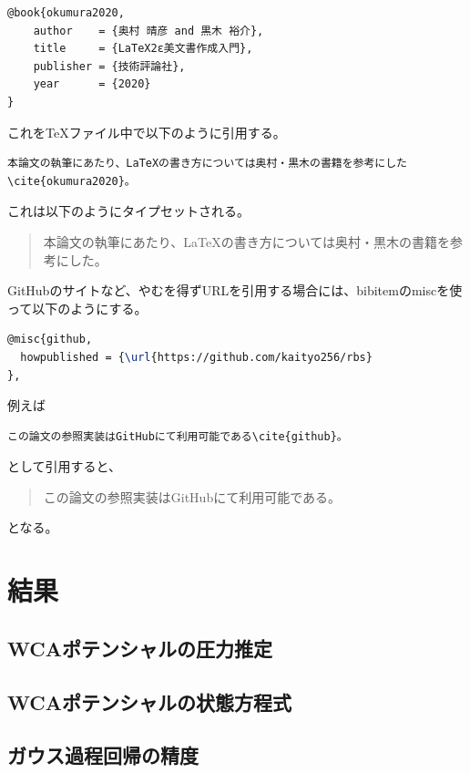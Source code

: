 \documentclass[titlepage]{jsreport}
\begin{document}
\begin{lstlisting}[language=TeX]
@book{okumura2020,
    author    = {奥村 晴彦 and 黒木 裕介},
    title     = {LaTeX2ε美文書作成入門},
    publisher = {技術評論社},
    year      = {2020}
}
\end{lstlisting}

これをTeXファイル中で以下のように引用する。

\begin{verbatim}
本論文の執筆にあたり、LaTeXの書き方については奥村・黒木の書籍を参考にした\cite{okumura2020}。
\end{verbatim}

これは以下のようにタイプセットされる。
\begin{quotation}
    本論文の執筆にあたり、LaTeXの書き方については奥村・黒木の書籍を参考にした\cite{okumura2020}。
\end{quotation}


GitHubのサイトなど、やむを得ずURLを引用する場合には、bibitemのmiscを使って以下のようにする。

\begin{lstlisting}[language=TeX]
@misc{github,
  howpublished = {\url{https://github.com/kaityo256/rbs}
},
\end{lstlisting}

例えば

\begin{verbatim}
この論文の参照実装はGitHubにて利用可能である\cite{github}。
\end{verbatim}
として引用すると、

\begin{quotation}
    この論文の参照実装はGitHubにて利用可能である\cite{github}。
\end{quotation}
となる。

\chapter{結果} \label{chap:results}

\section{WCAポテンシャルの圧力推定}

\section{WCAポテンシャルの状態方程式}

\section{ガウス過程回帰の精度}
\end{document}
